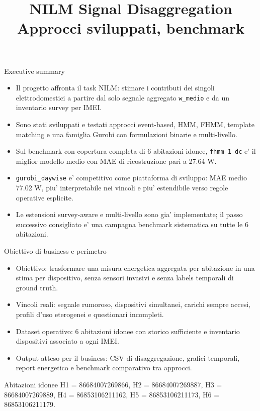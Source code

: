\documentclass[aspectratio=169]{beamer}
\title{NILM Signal Disaggregation\\Approcci sviluppati, benchmark}
\author{}
\date{}
\newcommand{\code}[1]{\texttt{#1}}
\begin{document}
\begin{frame}
  \titlepage
\end{frame}

\begin{frame}{Executive summary}
\small
\begin{itemize}
  \item Il progetto affronta il task NILM: stimare i contributi dei singoli elettrodomestici a partire dal solo segnale aggregato \code{w\_medio} e da un inventario survey per IMEI.
  \item Sono stati sviluppati e testati approcci event-based, HMM, FHMM, template matching e una famiglia Gurobi con formulazioni binarie e multi-livello.
  \item Sul benchmark con copertura completa di 6 abitazioni idonee, \code{fhmm\_1\_dc} e' il miglior modello medio con MAE di ricostruzione pari a 27.64 W.
  \item \code{gurobi\_daywise} e' competitivo come piattaforma di sviluppo: MAE medio 77.02 W, piu' interpretabile nei vincoli e piu' estendibile verso regole operative esplicite.
  \item Le estensioni survey-aware e multi-livello sono gia' implementate; il passo successivo consigliato e' una campagna benchmark sistematica su tutte le 6 abitazioni.
\end{itemize}
\end{frame}

\begin{frame}{Obiettivo di business e perimetro}
\small
\begin{itemize}
  \item Obiettivo: trasformare una misura energetica aggregata per abitazione in una stima per dispositivo, senza sensori invasivi e senza labels temporali di ground truth.
  \item Vincoli reali: segnale rumoroso, dispositivi simultanei, carichi sempre accesi, profili d'uso eterogenei e questionari incompleti.
  \item Dataset operativo: 6 abitazioni idonee con storico sufficiente e inventario dispositivi associato a ogni IMEI.
  \item Output atteso per il business: CSV di disaggregazione, grafici temporali, report energetico e benchmark comparativo tra approcci.
\end{itemize}

\vspace{0.5em}
\begin{block}{Abitazioni idonee}
\small
H1 = 86684007269866, H2 = 86684007269887, H3 = 86684007269889, H4 = 86853106211162, H5 = 86853106211173, H6 = 86853106211179.
\end{block}
\end{frame}
\end{document}
